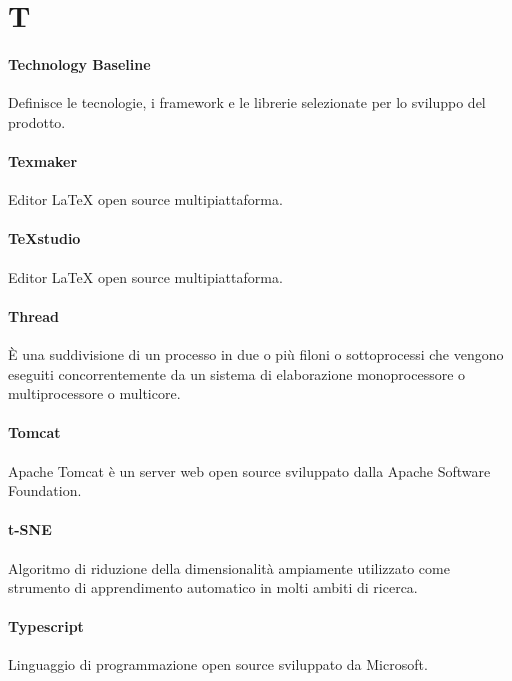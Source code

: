 \documentclass[]{article}
\begin{document}
	\newpage

	\section*{T}

	\paragraph*{Technology Baseline}
	Definisce le tecnologie, i framework e le librerie selezionate per lo sviluppo del prodotto.

	\paragraph*{Texmaker}
	Editor LaTeX open source multipiattaforma.

	\paragraph*{TeXstudio}
	Editor LaTeX open source multipiattaforma.

	\paragraph*{Thread}
	È una suddivisione di un processo in due o più filoni o sottoprocessi che vengono eseguiti concorrentemente da un sistema di elaborazione monoprocessore o multiprocessore o multicore.

	\paragraph*{Tomcat}
	Apache Tomcat è un server web open source sviluppato dalla Apache Software Foundation.

	\paragraph*{t-SNE}
	Algoritmo di riduzione della dimensionalità ampiamente utilizzato come strumento di apprendimento automatico in molti ambiti di ricerca.

	\paragraph*{Typescript}
	Linguaggio di programmazione open source sviluppato da Microsoft.

	\newpage
\end{document}
